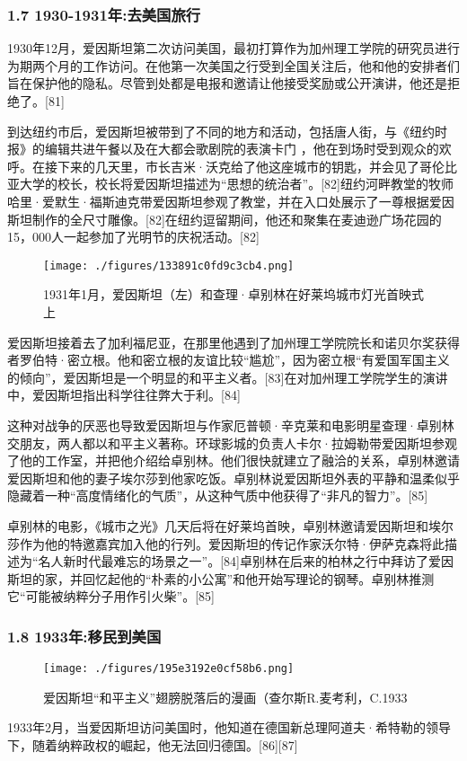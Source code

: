 \subsubsection{1.7 1930-1931年:去美国旅行}
1930年12月，爱因斯坦第二次访问美国，最初打算作为加州理工学院的研究员进行为期两个月的工作访问。在他第一次美国之行受到全国关注后，他和他的安排者们旨在保护他的隐私。尽管到处都是电报和邀请让他接受奖励或公开演讲，他还是拒绝了。[81]

到达纽约市后，爱因斯坦被带到了不同的地方和活动，包括唐人街，与《纽约时报》的编辑共进午餐以及在大都会歌剧院的表演卡门 ，他在到场时受到观众的欢呼。在接下来的几天里，市长吉米·沃克给了他这座城市的钥匙，并会见了哥伦比亚大学的校长，校长将爱因斯坦描述为“思想的统治者”。[82]纽约河畔教堂的牧师哈里·爱默生·福斯迪克带爱因斯坦参观了教堂，并在入口处展示了一尊根据爱因斯坦制作的全尺寸雕像。[82]在纽约逗留期间，他还和聚集在麦迪逊广场花园的15，000人一起参加了光明节的庆祝活动。[82]
\begin{figure}[ht]
\centering
\texttt{[image: ./figures/133891c0fd9c3cb4.png]}
\caption{1931年1月，爱因斯坦（左）和查理·卓别林在好莱坞城市灯光首映式上} \label{fig_AYST_9}
\end{figure}
爱因斯坦接着去了加利福尼亚，在那里他遇到了加州理工学院院长和诺贝尔奖获得者罗伯特·密立根。他和密立根的友谊比较“尴尬”，因为密立根“有爱国军国主义的倾向”，爱因斯坦是一个明显的和平主义者。[83]在对加州理工学院学生的演讲中，爱因斯坦指出科学往往弊大于利。[84]

这种对战争的厌恶也导致爱因斯坦与作家厄普顿·辛克莱和电影明星查理·卓别林交朋友，两人都以和平主义著称。环球影城的负责人卡尔·拉姆勒带爱因斯坦参观了他的工作室，并把他介绍给卓别林。他们很快就建立了融洽的关系，卓别林邀请爱因斯坦和他的妻子埃尔莎到他家吃饭。卓别林说爱因斯坦外表的平静和温柔似乎隐藏着一种“高度情绪化的气质”，从这种气质中他获得了“非凡的智力”。[85]

卓别林的电影，《城市之光》几天后将在好莱坞首映，卓别林邀请爱因斯坦和埃尔莎作为他的特邀嘉宾加入他的行列。爱因斯坦的传记作家沃尔特·伊萨克森将此描述为“名人新时代最难忘的场景之一”。[84]卓别林在后来的柏林之行中拜访了爱因斯坦的家，并回忆起他的“朴素的小公寓”和他开始写理论的钢琴。卓别林推测它“可能被纳粹分子用作引火柴”。[85]

\subsubsection{1.8 1933年:移民到美国}
\begin{figure}[ht]
\centering
\texttt{[image: ./figures/195e3192e0cf58b6.png]}
\caption{爱因斯坦“和平主义”翅膀脱落后的漫画（查尔斯R.麦考利，C.1933} \label{fig_AYST_10}
\end{figure}
1933年2月，当爱因斯坦访问美国时，他知道在德国新总理阿道夫·希特勒的领导下，随着纳粹政权的崛起，他无法回归德国。[86][87]

